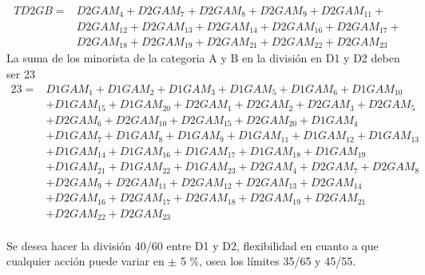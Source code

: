 \begin{equation*}
\begin{split}
  TD2GB = & D2GAM_4 + D2GAM_7 + D2GAM_8 + D2GAM_9 + D2GAM_{11} +\\
          & D2GAM_{12} + D2GAM_{13} + D2GAM_{14} + D2GAM_{16} + D2GAM_{17} +\\
          & D2GAM_{18} + D2GAM_{19} + D2GAM_{21} + D2GAM_{22} + D2GAM_{23}
\end{split}
\end{equation*}
La suma de los minorista de la categoria A y B en la división en D1 y D2 deben ser 23
\begin{equation*}
\begin{split}
23 =  	&   D1GAM_1 + D1GAM_2 + D1GAM_3 + D1GAM_5 + D1GAM_6 +  D1GAM_{10} \\
	    & + D1GAM_{15} + D1GAM_{20} + D2GAM_1 + D2GAM_2 + D2GAM_3 + D2GAM_5 \\
	    & + D2GAM_6 + D2GAM_{10} + D2GAM_{15} + D2GAM_{20} + D1GAM_4 \\
	    & + D1GAM_7 + D1GAM_8 + D1GAM_9 + D1GAM_{11} + D1GAM_{12} + D1GAM_{13} \\
	    & + D1GAM_{14} + D1GAM_{16} + D1GAM_{17} + D1GAM_{18} + D1GAM_{19} \\
	    & + D1GAM_{21} + D1GAM_{22} + D1GAM_{23} + D2GAM_4 + D2GAM_7 + D2GAM_8 \\
	    & + D2GAM_9 + D2GAM_{11} + D2GAM_{12} + D2GAM_{13} + D2GAM_{14} \\
	    & + D2GAM_{16} + D2GAM_{17} + D2GAM_{18} + D2GAM_{19} + D2GAM_{21} \\
	    & + D2GAM_{22} + D2GAM_{23}
\end{split}
\end{equation*}


\paragraph{} Se desea hacer la división 40/60 entre D1 y D2, flexibilidad en cuanto a que cualquier acción puede variar en $\pm$ 5 \%, osea los límites 35/65 y 45/55.\\ 
